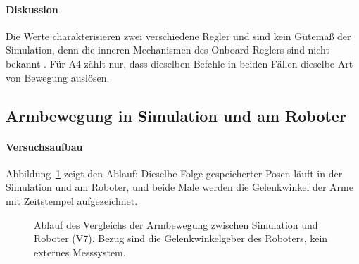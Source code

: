 
\paragraph*{Diskussion}
Die Werte charakterisieren zwei verschiedene Regler und sind kein Gütemaß der Simulation, denn die inneren Mechanismen des Onboard-Reglers sind nicht bekannt \cite{Hu2026}.
Für A4 zählt nur, dass dieselben Befehle in beiden Fällen dieselbe Art von Bewegung auslösen.

\subsection{Armbewegung in Simulation und am Roboter}
\label{sec:eval_manipulation}

\paragraph*{Versuchsaufbau}
Abbildung~\ref{fig:v7_ablauf} zeigt den Ablauf: Dieselbe Folge gespeicherter Posen läuft in der Simulation und am Roboter, und beide Male werden die Gelenkwinkel der Arme mit Zeitstempel aufgezeichnet.

\begin{figure}[htbp]
  \centering
  
  \caption[Ablauf des Vergleichs der Armbewegung]{Ablauf des Vergleichs der Armbewegung zwischen Simulation und Roboter (V7). Bezug sind die Gelenkwinkelgeber des Roboters, kein externes Messsystem.}
  \label{fig:v7_ablauf}
\end{figure}

